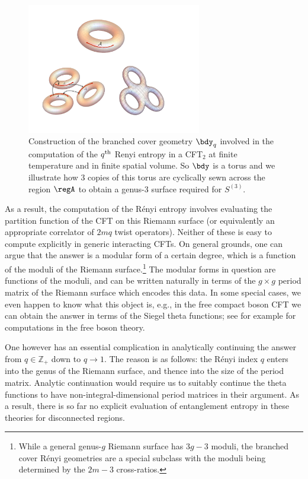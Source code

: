 \documentclass[12pt,openany]{book}
\begin{document}
\begin{figure}[htbp]
\begin{center}
\includegraphics[width=3in]{figures/branchcover3}
 \caption{Construction of the branched cover geometry $\bdy_q$ involved in the computation of the $q^{\rm th}$ Renyi entropy in a  CFT$_2$ at finite temperature and in finite spatial volume. So $\bdy$ is a torus and we illustrate how 3 copies of this torus are cyclically sewn across the region $\regA$ to obtain a genus-3 surface required for $S^{(3)}$. }
\label{f:branch3}
\end{center}
\end{figure}
%


As a result, the computation of the R\'enyi entropy  involves evaluating the partition function of the CFT on this Riemann surface (or equivalently an appropriate correlator of $2mq$ twist operators). Neither of these is easy to compute explicitly in generic interacting CFTs. On general grounds, one can argue that the answer is a modular form of a certain degree, which is a function of the moduli of the Riemann surface.\footnote{ While a general genus-$g$ Riemann surface has $3g-3$ moduli, the branched cover R\'enyi geometries are a special subclass with the moduli being determined by the $2m-3$ cross-ratios.} The modular forms in question are functions of the moduli, and can be written naturally in terms of the $g \times g$ period matrix of the Riemann surface which encodes this data. In some special cases, we even happen to know what this object is, e.g., in the free compact boson CFT we can obtain the answer in terms of the Siegel theta functions; see for example \cite{Calabrese:2009ez} for computations in the free boson theory.

One however has an essential complication in analytically continuing the answer from
$q\in {\mathbb Z} _+ $ down to $q\to 1$. The reason is as follows: the R\'enyi index $q$ enters into the genus of the Riemann surface, and thence into the size of the period matrix. Analytic continuation would require us to suitably continue the theta functions to have non-integral-dimensional period matrices in their argument.  As a result, there is so far no explicit evaluation of entanglement entropy in these theories for disconnected regions.
\end{document}
